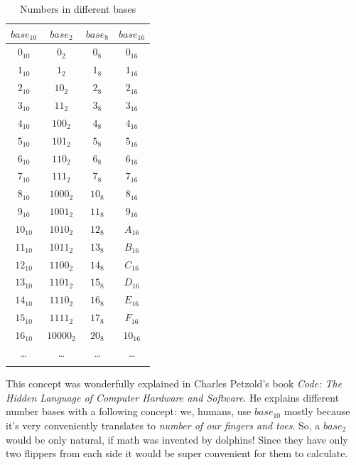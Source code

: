 \documentclass{report}
\begin{document}
            \begin{table}[H]
                \centering
                \begin{longtable}{|c|c|c|c|}
                    \hline
                    $base_{10}$ & $base_2$ & $base_8$ & $base_{16}$ \\\hline
                    $0_{10}$ & $0_2$ & $0_8$ & $0_{16}$ \\\hline
                    $1_{10}$ & $1_2$ & $1_8$ & $1_{16}$ \\\hline
                    $2_{10}$ & $10_2$ & $2_8$ & $2_{16}$ \\\hline
                    $3_{10}$ & $11_2$ & $3_8$ & $3_{16}$ \\\hline
                    $4_{10}$ & $100_2$ & $4_8$ & $4_{16}$ \\\hline
                    $5_{10}$ & $101_2$ & $5_8$ & $5_{16}$ \\\hline
                    $6_{10}$ & $110_2$ & $6_8$ & $6_{16}$ \\\hline
                    $7_{10}$ & $111_2$ & $7_8$ & $7_{16}$ \\\hline
                    $8_{10}$ & $1000_2$ & $10_8$ & $8_{16}$ \\\hline
                    $9_{10}$ & $1001_2$ & $11_8$ & $9_{16}$ \\\hline
                    $10_{10}$ & $1010_2$ & $12_8$ & $A_{16}$ \\\hline
                    $11_{10}$ & $1011_2$ & $13_8$ & $B_{16}$ \\\hline 
                    $12_{10}$ & $1100_2$ & $14_8$ & $C_{16}$ \\\hline
                    $13_{10}$ & $1101_2$ & $15_8$ & $D_{16}$ \\\hline
                    $14_{10}$ & $1110_2$ & $16_8$ & $E_{16}$ \\\hline
                    $15_{10}$ & $1111_2$ & $17_8$ & $F_{16}$ \\\hline
                    $16_{10}$ & $10000_2$ & $20_8$ & $10_{16}$ \\\hline 
                    \ldots & \ldots & \ldots & \ldots \\\hline
                    \caption{Numbers in different bases}

                \end{longtable}
            \end{table}


            This concept was wonderfully explained in Charles Petzold's book \emph{Code: The Hidden Language of Computer Hardware and Software}. He explains different
            number bases with a following concept: we, humans, use $base_{10}$ mostly because it's very conveniently translates to \emph{number of our fingers and toes}.
            So, a $base_2$ would be only natural, if math was invented by dolphins! Since they have only two flippers from each side it would be super convenient for
            them to calculate. \par
            
\end{document}
